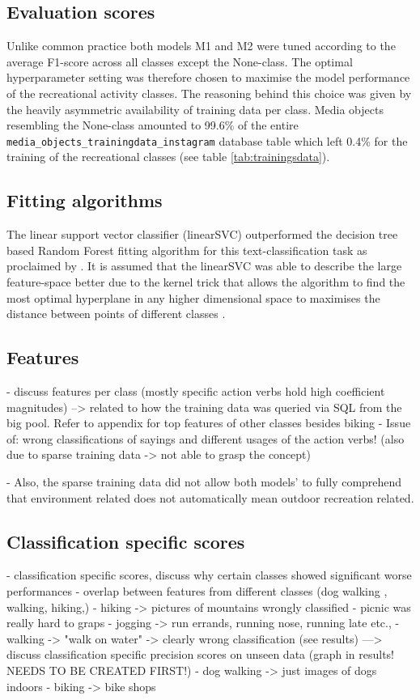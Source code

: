 \subsection{Evaluation scores}
Unlike common practice \parencite{Guido2016} both models M1 and M2 were tuned according to the average F1-score across all classes except the None-class. The optimal hyperparameter setting was therefore chosen to maximise the model performance of the recreational activity classes. The reasoning behind this choice was given by the heavily asymmetric availability of training data per class. Media objects resembling the None-class amounted to 99.6\% of the entire \texttt{media_objects_trainingdata_instagram} database table which left 0.4\% for the training of the recreational classes (see table \ref{tab:trainingsdata}).

\subsection{Fitting algorithms}
The linear support vector classifier (linearSVC) outperformed the decision tree based Random Forest fitting algorithm for this text-classification task as proclaimed by \parencite{Guido2016}. It is assumed that the linearSVC was able to describe the large feature-space better due to the kernel trick that allows the algorithm to find the most optimal hyperplane in any higher dimensional space to maximises the distance between points of different classes \parencite{Shawe-Taylor2004}.

\subsection{Features} \label{discussion_model_features}
- discuss features per class (mostly specific action verbs hold high coefficient magnitudes) --> related to how the training data was queried via SQL from the big pool. Refer to appendix for top features of other classes besides biking
- Issue of: wrong classifications of sayings and different usages of the action verbs! (also due to sparse training data -> not able to grasp the concept)

- Also, the sparse training data did not allow both models' to fully comprehend that environment related does not automatically mean outdoor recreation related.

\subsection{Classification specific scores}\label{discussion_class_specific_perform}
- classification specific scores, discuss why certain classes showed significant worse performances
- overlap between features from different classes (dog walking , walking, hiking,) 
- hiking -> pictures of mountains wrongly classified
- picnic was really hard to graps
- jogging -> run errands, running nose, running late etc., 
- walking -> "walk on water" -> clearly wrong classification (see results)
---> discuss classification specific precision scores on unseen data (graph in results! NEEDS TO BE CREATED FIRST!)
- dog walking -> just images of dogs indoors
- biking -> bike shops 

